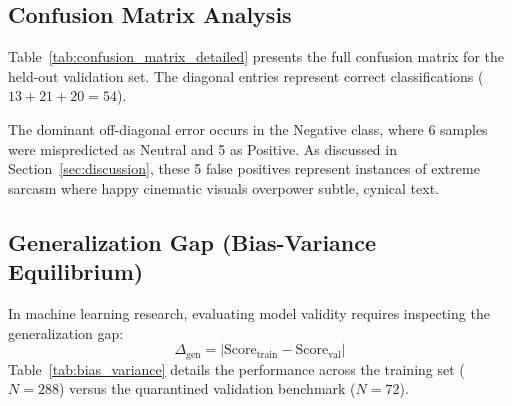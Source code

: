 \documentclass[10pt,journal,compsoc]{IEEEtran}
\begin{document}
\subsection{Confusion Matrix Analysis}
Table~\ref{tab:confusion_matrix_detailed} presents the full confusion matrix for the held-out validation set. The diagonal entries represent correct classifications ($13 + 21 + 20 = 54$).

\begin{table}[b]
\centering
\caption{Confusion Matrix on Strict Quarantined Benchmark ($N=72$)}
\label{tab:confusion_matrix_detailed}
\end{table}

The dominant off-diagonal error occurs in the Negative class, where 6 samples were mispredicted as Neutral and 5 as Positive. As discussed in Section~\ref{sec:discussion}, these 5 false positives represent instances of extreme sarcasm where happy cinematic visuals overpower subtle, cynical text.

\subsection{Generalization Gap (Bias-Variance Equilibrium)}
In machine learning research, evaluating model validity requires inspecting the generalization gap:
\begin{equation}
    \Delta_{\text{gen}} = |\text{Score}_{\text{train}} - \text{Score}_{\text{val}}|
\end{equation}
Table~\ref{tab:bias_variance} details the performance across the training set ($N=288$) versus the quarantined validation benchmark ($N=72$).
\end{document}
